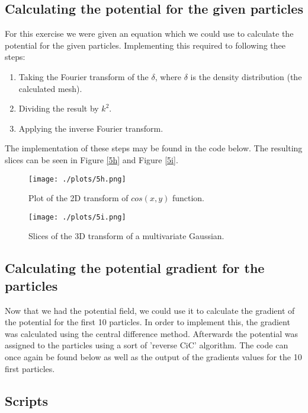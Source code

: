 \documentclass[a4paper,10pt]{article}
\begin{document}
\subsection{Calculating the potential for the given particles}

For this exercise we were given an equation which we could use to calculate the potential for the given particles. Implementing this required to following thee steps: 

\begin{enumerate}
	\item Taking the Fourier transform of the $\delta$, where $\delta$ is the density distribution (the calculated mesh). 
	\item Dividing the result by $k^2$. 
	\item Applying the inverse Fourier transform.  
\end{enumerate}

The implementation of these steps may be found in the code below. The resulting slices can be seen in Figure \ref{5h} and Figure \ref{5i}. 

\begin{figure}[h!]
  \centering
  \texttt{[image: ./plots/5h.png]}
  \caption{Plot of the 2D transform of $cos(x,y)$ function.}
  \label{fig:5h}
\end{figure}

\begin{figure}[h!]
  \centering
  \texttt{[image: ./plots/5i.png]}
  \caption{Slices of the 3D transform of a multivariate Gaussian.}
  \label{fig:5i}
\end{figure}

\subsection{Calculating the potential gradient for the particles}

Now that we had the potential field, we could use it to calculate the gradient of the potential for the first 10 particles. In order to implement this, the gradient was calculated using the central difference method. Afterwards the potential was assigned to the particles using a sort of 'reverse CiC' algorithm. The code can once again be found below as well as the output of the gradients values for the 10 first particles. 

\subsection{Scripts}
\end{document}
